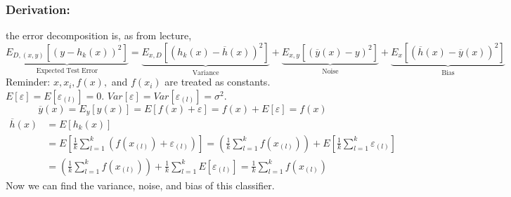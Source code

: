 \documentclass{article}
\begin{document}
    \subsubsection*{Derivation:} the error decomposition is, as from lecture,
    $$\underbrace{E_{D,(x, y)} \left[\left(y-h_{k}(x)\right)^{2}\right]}_\mathrm{Expected\;Test\;Error} = \underbrace{E_{x, D}\left[\left(h_{k}(x) - \overline{h}(x)\right)^{2}\right]}_\mathrm{Variance} + \underbrace{E_{x, y}\left[\left(\overline{y}(x) - y\right)^{2}\right]}_\mathrm{Noise} + \underbrace{E_{x}\left[\left(\overline{h}(x) - \overline{y}(x)\right)^{2}\right]}_\mathrm{Bias}$$
    Reminder: $x,x_i,f(x),$ and $f(x_i)$ are treated as constants. $E[\varepsilon]=E[\varepsilon_{(l)}]=0$. $Var[\varepsilon]=Var[\varepsilon_{(l)}]=\sigma^2.$
    $$\overline{y}(x)=E_{y}\left[y(x)\right] = E\left[f(x)+\varepsilon\right]=f(x)+E\left[\varepsilon\right] = f(x)$$
    \begin{align*}
        \overline{h}(x)&=E\left[h_k(x)\right]\\
        &=E\left[\frac{1}{k}\sum_{l=1}^{k}(f(x_{(l)}) + \varepsilon_{(l)})\right]=\left(\frac{1}{k}\sum_{l=1}^{k}f(x_{(l)})\right) + E\left[\frac{1}{k}\sum_{l=1}^{k}\varepsilon_{(l)}\right]\\
        &=\left(\frac{1}{k}\sum_{l=1}^{k}f(x_{(l)})\right) + \frac{1}{k}\sum_{l=1}^{k}E\left[\varepsilon_{(l)}\right]=\frac{1}{k}\sum_{l=1}^{k}f(x_{(l)})
    \end{align*}
    Now we can find the variance, noise, and bias of this classifier.
\end{document}
